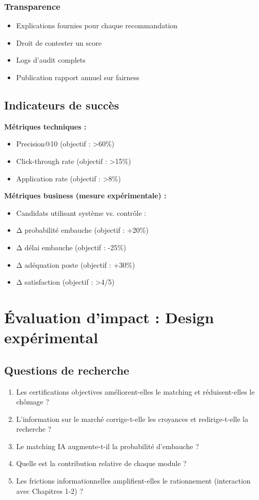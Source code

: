\documentclass[12pt]{article}
\begin{document}
\subsubsection{Transparence}

\begin{itemize}
    \item Explications fournies pour chaque recommandation
    \item Droit de contester un score
    \item Logs d'audit complets
    \item Publication rapport annuel sur fairness
\end{itemize}

\subsection{Indicateurs de succès}

\textbf{Métriques techniques :}
\begin{itemize}
    \item Precision@10 (objectif : >60\%)
    \item Click-through rate (objectif : >15\%)
    \item Application rate (objectif : >8\%)
\end{itemize}

\textbf{Métriques business (mesure expérimentale) :}
\begin{itemize}
    \item Candidats utilisant système vs. contrôle :
    \item Δ probabilité embauche (objectif : +20\%)
    \item Δ délai embauche (objectif : -25\%)
    \item Δ adéquation poste (objectif : +30\%)
    \item Δ satisfaction (objectif : >4/5)
\end{itemize}

\section{Évaluation d'impact : Design expérimental}

\subsection{Questions de recherche}

\begin{enumerate}
    \item Les certifications objectives améliorent-elles le matching et réduisent-elles le chômage ?
    \item L'information sur le marché corrige-t-elle les croyances et redirige-t-elle la recherche ?
    \item Le matching IA augmente-t-il la probabilité d'embauche ?
    \item Quelle est la contribution relative de chaque module ?
    \item Les frictions informationnelles amplifient-elles le rationnement (interaction avec Chapitres 1-2) ?
\end{enumerate}
\end{document}

